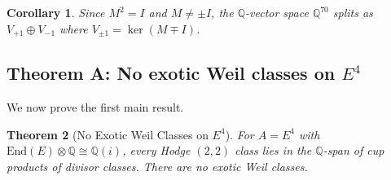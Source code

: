 \documentclass[11pt]{article}
\theoremstyle{plain}
\newtheorem{theorem}{Theorem}[section]
\newtheorem{corollary}[theorem]{Corollary}
\theoremstyle{definition}
\theoremstyle{remark}
\newcommand{\Q}{\mathbb{Q}}
\newcommand{\End}{\mathrm{End}}
\begin{document}
\begin{corollary}\label{cor:eigenspace-dim}
Since $M^2 = I$ and $M \neq \pm I$, the $\Q$-vector space
$\Q^{70}$ splits as
$V_{+1} \oplus V_{-1}$ where $V_{\pm 1} = \ker(M \mp I)$.
\end{corollary}

\subsection{Theorem A: No exotic Weil classes on $E^4$}

We now prove the first main result.

\begin{theorem}[No Exotic Weil Classes on $E^4$]\label{thm:no-exotic}
For $A = E^4$ with $\End(E) \otimes \Q \cong \Q(i)$, every
Hodge $(2,2)$ class lies in the $\Q$-span of cup products of
divisor classes.  There are no exotic Weil classes.
\end{theorem}
\end{document}
